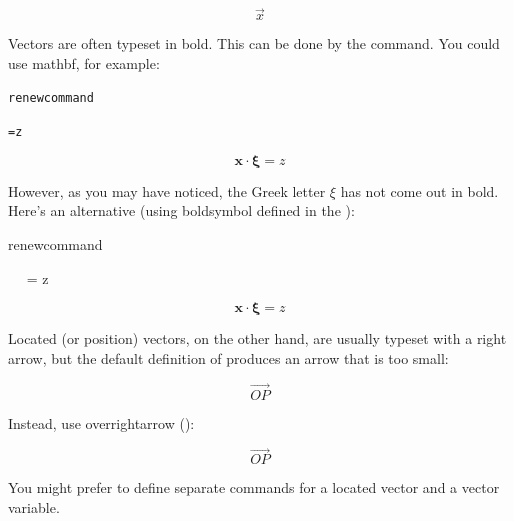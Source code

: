 \begin{codeS}
\end{codeS}
\begin{resultS}
\[ \vec{x} \]
\end{resultS}

Vectors are often typeset in bold.  This can be 
done by  the 
command.
You could use \gls{mathbf}, for example:
\begin{code}
\begin{alltt}
\gls{renewcommand}

   = z
\end{alltt}
\end{code}\bookpagebreak\noindent
\begin{resultS}
\[
\mathbf{x}\cdot\mathbf{\xi} = z
\]
\end{resultS}
\label{cmd:vec}However, as you may have
noticed, the 
Greek letter $\xi$ has not come out in bold.  Here's an alternative 
(using \gls{boldsymbol} defined in the  ):
\begin{code}
\gls{renewcommand}\newline
{}\newline
\strut~~ = z\newline
{}
\end{code}%
\begin{resultS}
\[
\boldsymbol{x}\cdot\boldsymbol{\xi} = z
\]
\end{resultS}

Located (or position) vectors, on the other hand, are usually typeset with a right
arrow, but the default definition of  produces an
arrow that is too small:
\begin{codeS}
\end{codeS}
\begin{resultS}
\[
\vec{OP}
\]
\end{resultS}
Instead, use \gls{overrightarrow} ():
\begin{codeS}
\end{codeS}
\begin{resultS}
\[
\overrightarrow{OP}
\]
\end{resultS}
You might prefer to define separate commands for a located vector and a vector
variable.

